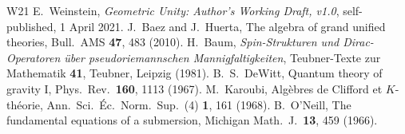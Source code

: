 \documentclass[11pt]{article}
\theoremstyle{remark}
\begin{document}
\begin{thebibliography}{W21}
 E.~Weinstein, \emph{Geometric Unity: Author's Working Draft, v1.0}, self-published, 1 April 2021.
 J.~Baez and J.~Huerta, The algebra of grand unified theories, Bull.\ AMS \textbf{47}, 483 (2010).
 H.~Baum, \emph{Spin-Strukturen und Dirac-Operatoren \"uber pseudoriemannschen Mannigfaltigkeiten}, Teubner-Texte zur Mathematik \textbf{41}, Teubner, Leipzig (1981).
 B.~S.~DeWitt, Quantum theory of gravity I, Phys.\ Rev.\ \textbf{160}, 1113 (1967).
 M.~Karoubi, Alg\`ebres de Clifford et $K$-th\'eorie, Ann.\ Sci.\ \'Ec.\ Norm.\ Sup.\ (4) \textbf{1}, 161 (1968).
 B.~O'Neill, The fundamental equations of a submersion, Michigan Math.\ J.\ \textbf{13}, 459 (1966).
\end{thebibliography}
\end{document}
